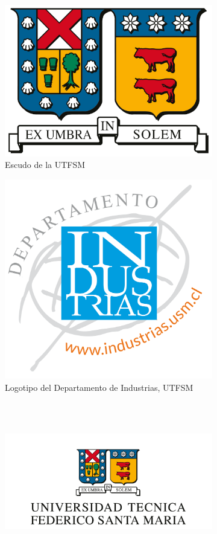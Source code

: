     \begin{figure}[ht!]
        \begin{subfigure}[b]{0.4\textwidth}
        \centering
        \includegraphics[width = .7\textwidth]{figures/escudo-utfsm.png}
        \caption{Escudo de la UTFSM}
        \label{fig:escudo}
        \end{subfigure}%
        \hfill
        \begin{subfigure}[b]{0.4\textwidth}
        \centering
        \includegraphics[width = .6\textwidth]{figures/logoind.png}
        \caption{Logotipo del Departamento de Industrias, UTFSM }
        \label{fig:logoindustrias}
        \end{subfigure}%
        \\
        \bigskip
        \\
        \begin{subfigure}[b]{0.4\textwidth}
        \centering
        \includegraphics[width = .9\textwidth]{figures/logousmleyenda}

\end{subfigure}
\end{figure}
